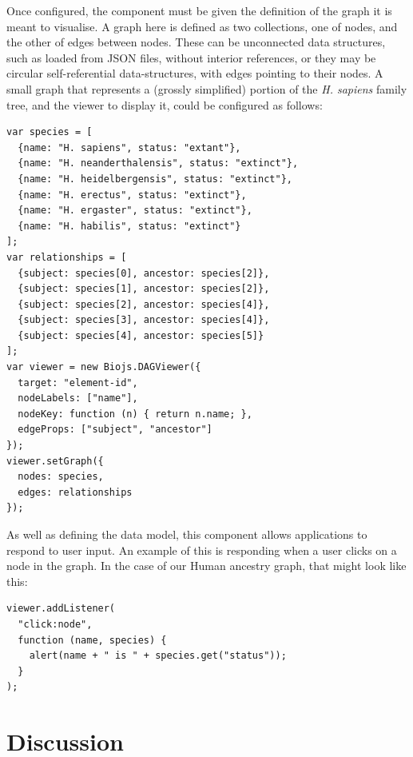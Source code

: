 \documentclass[10pt,a4paper,twocolumn]{article}
\begin{document}
Once configured, the component must be given the definition of the graph it is
meant to visualise. A graph here is defined as two collections, one of nodes,
and the other of edges between nodes. These can be unconnected data structures,
such as loaded from JSON files, without interior references, or they may be
circular self-referential data-structures, with edges pointing to their nodes. A
small graph that represents a (grossly simplified) portion of the \textit{H.
sapiens} family tree, and the viewer to display it, could be configured as
follows:

\begin{lstlisting}[caption={\emph{H. sapiens} phylogenetic tree sample graph}]
var species = [
  {name: "H. sapiens", status: "extant"},
  {name: "H. neanderthalensis", status: "extinct"},
  {name: "H. heidelbergensis", status: "extinct"},
  {name: "H. erectus", status: "extinct"},
  {name: "H. ergaster", status: "extinct"},
  {name: "H. habilis", status: "extinct"}
];
var relationships = [
  {subject: species[0], ancestor: species[2]},
  {subject: species[1], ancestor: species[2]},
  {subject: species[2], ancestor: species[4]},
  {subject: species[3], ancestor: species[4]},
  {subject: species[4], ancestor: species[5]}
];
var viewer = new Biojs.DAGViewer({
  target: "element-id",
  nodeLabels: ["name"],
  nodeKey: function (n) { return n.name; },
  edgeProps: ["subject", "ancestor"]
});
viewer.setGraph({
  nodes: species,
  edges: relationships
});
\end{lstlisting}

As well as defining the data model, this component allows applications to
respond to user input. An example of this is responding when a user clicks on a
node in the graph. In the case of our Human ancestry graph, that might look like
this:

\begin{lstlisting}[caption={Listening for Events}, label={code:add-listener}]
viewer.addListener(
  "click:node",
  function (name, species) {
    alert(name + " is " + species.get("status"));
  }
);
\end{lstlisting}

\section*{Discussion}
\end{document}
